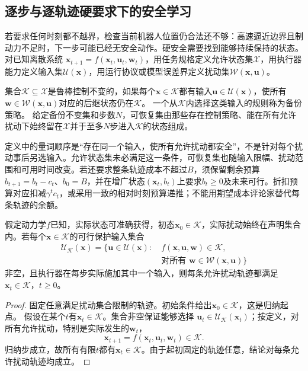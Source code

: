 \subsection{逐步与逐轨迹硬要求下的安全学习}
\label{sec:rl-trustworthy-hard-safety}

若要求任何时刻都不越界，检查当前机器人位置仍合法还不够：高速逼近边界且制动力不足时，下一步可能已经无安全动作。硬安全需要找到能够持续保持的状态。对已知离散系统
$\bm{x}_{t+1}=f(\bm{x}_t,\bm{u}_t,\bm{w}_t)$，用任务规格定义允许状态集$\mathcal X$，用执行器能力定义输入集$\mathcal U(\bm{x})$，用运行协议或模型误差界定义扰动集$\mathcal W(\bm{x},\bm{u})$。

\begin{definition}[控制不变集与可恢复集]
  \label{def:rl-trustworthy-invariance}
  集合$\mathcal K\subseteq\mathcal X$是鲁棒控制不变的，如果每个$\bm{x}\in\mathcal K$都有输入$\bm{u}\in\mathcal U(\bm{x})$，使所有
  $\bm{w}\in\mathcal W(\bm{x},\bm{u})$对应的后继状态仍在$\mathcal K$。
  一个从$\mathcal K$内选择这类输入的规则称为备份策略。
  给定备份不变集和步数$N$，可恢复集由那些存在控制策略、能在所有允许扰动下始终留在$\mathcal X$并于至多$N$步进入$\mathcal K$的状态组成。
\end{definition}

定义中的量词顺序是“存在同一个输入，使所有允许扰动都安全”，不是针对每个扰动事后另选输入。允许状态集未必满足这一条件，可恢复集也随输入限幅、扰动范围和可用时间改变。若还要求整条轨迹成本不超过$B$，须保留剩余预算
$b_{t+1}=b_t-c_t$、$b_0=B$，并在增广状态$(\bm{x}_t,b_t)$上要求$b_t\geq0$及未来可行。折扣预算对应扣减$\gamma^tc_t$，或采用一致的相对时刻预算递推；不能用期望成本评论家替代每条轨迹的余额。

\begin{theorem}[安全集的一步封闭性保证]
  \label{thm:rl-trustworthy-invariance}
  假定动力学$f$已知，实际状态可准确获得，初态$\bm{x}_0\in\mathcal K$，实际扰动始终在声明集合内。若每个$\bm{x}\in\mathcal K$的可行保护输入集合
  \[
    \begin{aligned}
      \mathcal U_{\mathcal K}(\bm{x})
        =\bigl\{\bm{u}\in\mathcal U(\bm{x}):\ &
          f(\bm{x},\bm{u},\bm{w})\in\mathcal K,\\
        &\text{对所有 }\bm{w}\in\mathcal W(\bm{x},\bm{u})\bigr\}
    \end{aligned}
  \]
  非空，且执行器在每步实际施加其中一个输入，则每条允许扰动轨迹都满足$\bm{x}_t\in\mathcal K$，$t\geq0$。
\end{theorem}
\begin{proof}
  固定任意满足扰动集合限制的轨迹。初始条件给出$\bm{x}_0\in\mathcal K$，这是归纳起点。
  假设在某个$t$有$\bm{x}_t\in\mathcal K$。集合非空保证能够选择
  $\bm{u}_t\in\mathcal U_{\mathcal K}(\bm{x}_t)$；按定义，对所有允许扰动，特别是实际发生的$\bm{w}_t$，
  \[
    \bm{x}_{t+1}=f(\bm{x}_t,\bm{u}_t,\bm{w}_t)\in\mathcal K.
  \]
  归纳步成立，故所有有限$t$都有$\bm{x}_t\in\mathcal K$。由于起初固定的轨迹任意，结论对每条允许扰动轨迹均成立。
\end{proof}

